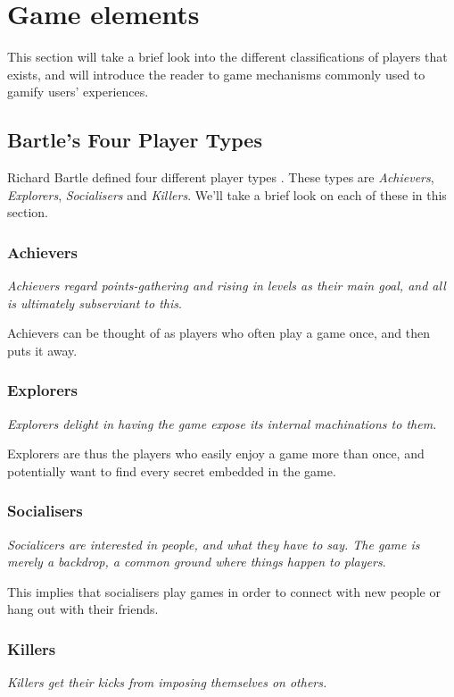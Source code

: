 \section{Game elements}

This section will take a brief look into the different classifications of players that exists, and will introduce the reader to game mechanisms commonly used to gamify users' experiences. 

\subsection{Bartle's Four Player Types}
Richard Bartle defined four different player types \cite{bartle-gamers}. These types are \emph{Achievers},  \emph{Explorers},  \emph{Socialisers} and \emph{Killers}. We'll take a brief look on each of these in this section. 

\subsubsection{Achievers}
\textit{Achievers regard points-gathering and rising in levels as their main goal, and all is ultimately subserviant to this}. 

Achievers can be thought of as players who often play a game once, and then puts it away. 

\subsubsection{Explorers}
\textit{Explorers delight in having the game expose its internal machinations to them.}

Explorers are thus the players who easily enjoy a game more than once, and potentially want to find every secret embedded in the game. 

\subsubsection{Socialisers}
\textit{Socialicers are interested in people, and what they have to say. The game is merely a backdrop, a common ground where things happen to players}. 

This implies that socialisers play games in order to connect with new people or hang out with their friends. 

\subsubsection{Killers}
\textit{Killers get their kicks from imposing themselves on others.}


